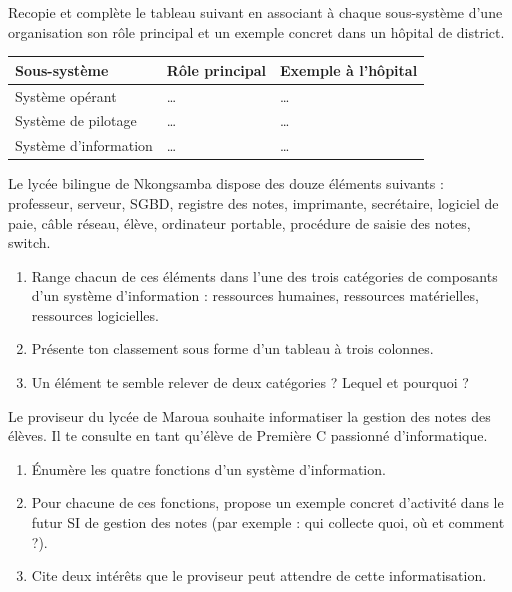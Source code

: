 \documentclass[11pt]{article}
\newcounter{popsec}
\newcounter{popsub}
\newcommand{\courssub}[1]{%
  \stepcounter{popsub}%
  \par\vspace{9pt}\noindent{\popxbold\fontsize{11.5}{13}\selectfont\color{popink}{\color{poporange}\thepopsec.\thepopsub}\hspace{6pt}#1}\par\nopagebreak\vspace{4pt}
}
\begin{document}
\begin{exercice}
Recopie et complète le tableau suivant en associant à chaque sous-système d'une organisation son rôle principal et un exemple concret dans un hôpital de district.
\begin{center}
\begin{tabularx}{\linewidth}{|l|X|X|}
\hline
\rowcolor{popblueL} \textbf{Sous-système} & \textbf{Rôle principal} & \textbf{Exemple à l'hôpital} \\
\hline
Système opérant & \ldots & \ldots \\
\hline
Système de pilotage & \ldots & \ldots \\
\hline
Système d'information & \ldots & \ldots \\
\hline
\end{tabularx}
\end{center}
\end{exercice}

\courssub{Je m'entraîne}

\begin{exercice}
Le lycée bilingue de Nkongsamba dispose des douze éléments suivants : professeur, serveur, SGBD, registre des notes, imprimante, secrétaire, logiciel de paie, câble réseau, élève, ordinateur portable, procédure de saisie des notes, switch.
\begin{enumerate}
\item Range chacun de ces éléments dans l'une des trois catégories de composants d'un système d'information : ressources humaines, ressources matérielles, ressources logicielles.
\item Présente ton classement sous forme d'un tableau à trois colonnes.
\item Un élément te semble relever de deux catégories ? Lequel et pourquoi ?
\end{enumerate}
\end{exercice}

\begin{exercice}
Le proviseur du lycée de Maroua souhaite informatiser la gestion des notes des élèves. Il te consulte en tant qu'élève de Première C passionné d'informatique.
\begin{enumerate}
\item Énumère les quatre fonctions d'un système d'information.
\item Pour chacune de ces fonctions, propose un exemple concret d'activité dans le futur SI de gestion des notes (par exemple : qui collecte quoi, où et comment ?).
\item Cite deux intérêts que le proviseur peut attendre de cette informatisation.
\end{enumerate}
\end{exercice}
\end{document}
